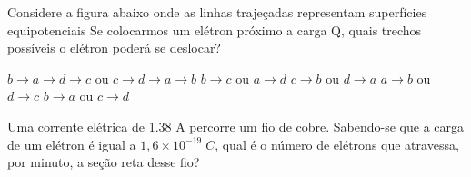 \documentclass[12pt, addpoints]{exam}
\begin{document}
    \begin{questions}
\begin{multicols*}{2}
\question Considere a figura abaixo onde as linhas trajeçadas representam superfícies equipotenciais Se colocarmos um elétron próximo a carga Q, quais trechos possíveis o elétron poderá se deslocar?
        
        \begin{center}
            \begin{minipage}[c]{0.5\linewidth}
            \end{minipage}
        \end{center}
        
        

\begin{choices}
\choice $b\rightarrow a\rightarrow d\rightarrow c$ ou $c\rightarrow d\rightarrow a\rightarrow b$ 
\choice $b\rightarrow c$ ou $a\rightarrow d$ 
\choice $c\rightarrow b$ ou $d\rightarrow a$ 
\choice $a\rightarrow b$ ou $d\rightarrow c$ 
\choice $b\rightarrow a$ ou $c\rightarrow d$ 
\end{choices}
\question Uma corrente elétrica de    1.38 A percorre um ﬁo de cobre. Sabendo-se que a carga de um elétron é igual a $1,6\times 10^{-19}\;C$, qual é o número de elétrons que atravessa, por minuto, a seção reta desse ﬁo?


\end{multicols*}
\end{questions}
\end{document}
